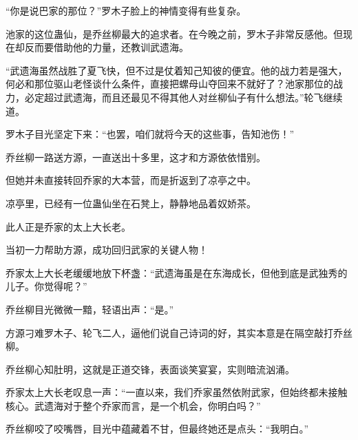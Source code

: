 \begin{this_body}
“你是说巴家的那位？”罗木子脸上的神情变得有些复杂。

池家的这位蛊仙，是乔丝柳最大的追求者。在今晚之前，罗木子非常反感他。但现在却反而要借助他的力量，还教训武遗海。

“武遗海虽然战胜了夏飞快，但不过是仗着知己知彼的便宜。他的战力若是强大，何必和那位驱山老怪谈什么条件，直接把螺母山夺回来不就好了？池家那位的战力，必定超过武遗海，而且还最见不得其他人对丝柳仙子有什么想法。”轮飞继续道。

罗木子目光坚定下来：“也罢，咱们就将今天的这些事，告知池伤！”

乔丝柳一路送方源，一直送出十多里，这才和方源依依惜别。

但她并未直接转回乔家的大本营，而是折返到了凉亭之中。

凉亭里，已经有一位蛊仙坐在石凳上，静静地品着奴娇茶。

此人正是乔家的太上大长老。

当初一力帮助方源，成功回归武家的关键人物！

乔家太上大长老缓缓地放下杯盏：“武遗海虽是在东海成长，但他到底是武独秀的儿子。你觉得呢？”

乔丝柳目光微微一黯，轻语出声：“是。”

方源刁难罗木子、轮飞二人，逼他们说自己诗词的好，其实本意是在隔空敲打乔丝柳。

乔丝柳心知肚明，这就是正道交锋，表面谈笑宴宴，实则暗流汹涌。

乔家太上大长老叹息一声：“一直以来，我们乔家虽然依附武家，但始终都未接触核心。武遗海对于整个乔家而言，是一个机会，你明白吗？”

乔丝柳咬了咬嘴唇，目光中蕴藏着不甘，但最终她还是点头：“我明白。”

\end{this_body}

